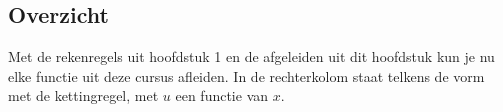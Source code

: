 \begin{oefeningen}

\end{oefeningen}

\subsection{Overzicht}

Met de rekenregels uit hoofdstuk 1 en de afgeleiden uit dit hoofdstuk kun je nu elke functie uit deze cursus afleiden. In de rechterkolom staat telkens de vorm met de kettingregel, met $u$ een functie van $x$.


\opdrachtenkop

